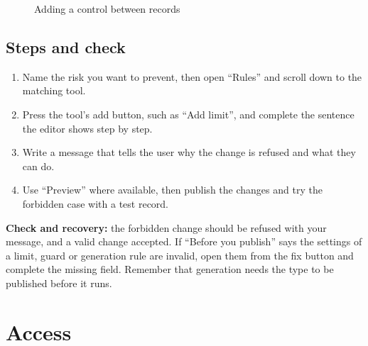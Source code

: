 \begin{figure}[H]
\centering
{}
\rclegend
\caption{Adding a control between records}
\label{fig:builder-record-limits-flow}
\end{figure}

\subsection{Steps and check}
\begin{enumerate}
\item Name the risk you want to prevent, then open “Rules” and scroll down to the matching tool.
\item Press the tool's add button, such as “Add limit”, and complete the sentence the editor shows step by step.
\item Write a message that tells the user why the change is refused and what they can do.
\item Use “Preview” where available, then publish the changes and try the forbidden case with a test record.
\end{enumerate}

\textbf{Check and recovery:} the forbidden change should be refused with your message, and a valid change accepted. If “Before you publish” says the settings of a limit, guard or generation rule are invalid, open them from the fix button and complete the missing field. Remember that generation needs the type to be published before it runs.

\clearpage
\section{Access}
\label{sec:builder-feature-access}

